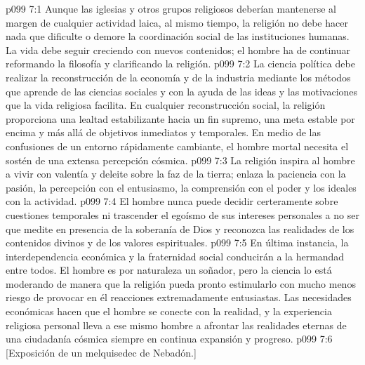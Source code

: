 \vs p099 7:1 Aunque las iglesias y otros grupos religiosos deberían mantenerse al margen de cualquier actividad laica, al mismo tiempo, la religión no debe hacer nada que dificulte o demore la coordinación social de las instituciones humanas. La vida debe seguir creciendo con nuevos contenidos; el hombre ha de continuar reformando la filosofía y clarificando la religión.
\vs p099 7:2 La ciencia política debe realizar la reconstrucción de la economía y de la industria mediante los métodos que aprende de las ciencias sociales y con la ayuda de las ideas y las motivaciones que la vida religiosa facilita. En cualquier reconstrucción social, la religión proporciona una lealtad estabilizante hacia un fin supremo, una meta estable por encima y más allá de objetivos inmediatos y temporales. En medio de las confusiones de un entorno rápidamente cambiante, el hombre mortal necesita el sostén de una extensa percepción cósmica.
\vs p099 7:3 La religión inspira al hombre a vivir con valentía y deleite sobre la faz de la tierra; enlaza la paciencia con la pasión, la percepción con el entusiasmo, la comprensión con el poder y los ideales con la actividad.
\vs p099 7:4 El hombre nunca puede decidir certeramente sobre cuestiones temporales ni trascender el egoísmo de sus intereses personales a no ser que medite en presencia de la soberanía de Dios y reconozca las realidades de los contenidos divinos y de los valores espirituales.
\vs p099 7:5 En última instancia, la interdependencia económica y la fraternidad social conducirán a la hermandad entre todos. El hombre es por naturaleza un soñador, pero la ciencia lo está moderando de manera que la religión pueda pronto estimularlo con mucho menos riesgo de provocar en él reacciones extremadamente entusiastas. Las necesidades económicas hacen que el hombre se conecte con la realidad, y la experiencia religiosa personal lleva a ese mismo hombre a afrontar las realidades eternas de una ciudadanía cósmica siempre en continua expansión y progreso.
\vsetoff
\vs p099 7:6 [Exposición de un melquisedec de Nebadón.]
